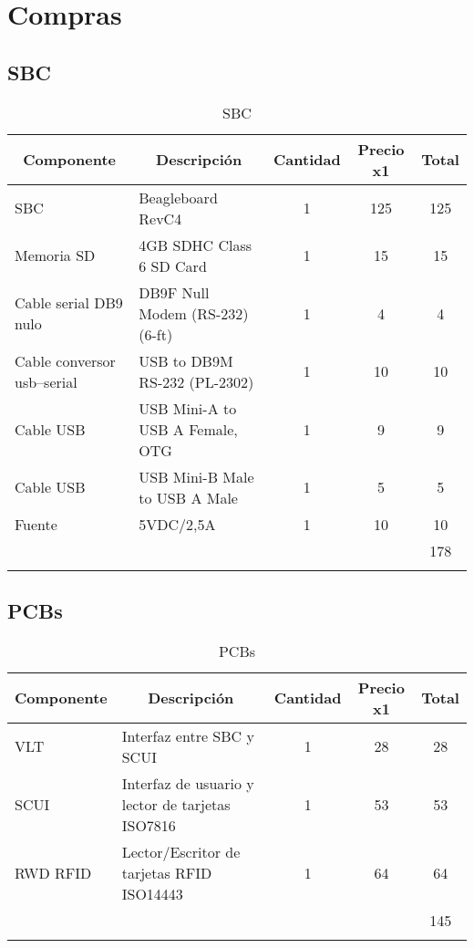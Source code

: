 \chapter{Compras}


\section{SBC}
\begin{longtable}{|l|l|c|c|c|}
\hline
\multicolumn{1}{|c|}{\textbf{Componente}} & \multicolumn{1}{c|}{\textbf{Descripción}} & \textbf{Cantidad} & \textbf{Precio x1} & \textbf{Total} \\ \hline
SBC & Beagleboard  RevC4 & 1 & 125 & 125 \\ \hline
Memoria SD & 4GB SDHC Class 6 SD Card & 1 & 15 & 15 \\ \hline
Cable serial DB9 nulo & DB9F Null Modem (RS-232) (6-ft) & 1 & 4 & 4 \\ \hline
Cable conversor usb–serial & USB to DB9M RS-232 (PL-2302) & 1 & 10 & 10 \\ \hline
Cable USB & USB Mini-A to USB A Female, OTG & 1 & 9 & 9 \\ \hline
Cable USB & USB Mini-B Male to USB A Male & 1 & 5 & 5 \\ \hline
Fuente  & 5VDC/2,5A & 1 & 10 & 10 \\ \hline
 &  & \multicolumn{1}{l|}{} & \multicolumn{1}{l|}{} & 178 \\ \hline
\caption{SBC}
\label{}
\end{longtable}


\section{PCBs}
\begin{longtable}{|l|l|c|c|c|}
\hline
\multicolumn{1}{|c|}{\textbf{Componente}} & \multicolumn{1}{c|}{\textbf{Descripción}} & \textbf{Cantidad} & \textbf{Precio x1} & \textbf{Total} \\ \hline
VLT & Interfaz entre SBC y SCUI & 1 & 28 & 28 \\ \hline
SCUI & Interfaz de usuario y lector de tarjetas ISO7816 & 1 & 53 & 53 \\ \hline
RWD RFID & Lector/Escritor de tarjetas RFID ISO14443 & 1 & 64 & 64 \\ \hline
 &  & \multicolumn{1}{l|}{} & \multicolumn{1}{l|}{} & 145 \\ \hline
\caption{PCBs}
\label{}
\end{longtable}


